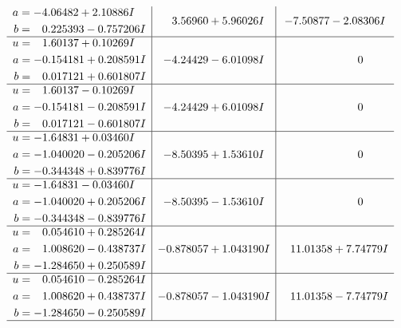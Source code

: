\documentclass[1p]{elsarticle_modified}
\theoremstyle{definition}
\begin{document}
$$\begin{array}{c|c|c}
\begin{aligned}
a &= -4.06482 + 2.10886 I \\
b &= \phantom{-}0.225393 - 0.757206 I\end{aligned}
 & \phantom{-}3.56960 + 5.96026 I & -7.50877 - 2.08306 I \\ \hline\begin{aligned}
u &= \phantom{-}1.60137 + 0.10269 I \\
a &= -0.154181 + 0.208591 I \\
b &= \phantom{-}0.017121 + 0.601807 I\end{aligned}
 & -4.24429 - 6.01098 I & \phantom{-0.000000 } 0 \\ \hline\begin{aligned}
u &= \phantom{-}1.60137 - 0.10269 I \\
a &= -0.154181 - 0.208591 I \\
b &= \phantom{-}0.017121 - 0.601807 I\end{aligned}
 & -4.24429 + 6.01098 I & \phantom{-0.000000 } 0 \\ \hline\begin{aligned}
u &= -1.64831 + 0.03460 I \\
a &= -1.040020 - 0.205206 I \\
b &= -0.344348 + 0.839776 I\end{aligned}
 & -8.50395 + 1.53610 I & \phantom{-0.000000 } 0 \\ \hline\begin{aligned}
u &= -1.64831 - 0.03460 I \\
a &= -1.040020 + 0.205206 I \\
b &= -0.344348 - 0.839776 I\end{aligned}
 & -8.50395 - 1.53610 I & \phantom{-0.000000 } 0 \\ \hline\begin{aligned}
u &= \phantom{-}0.054610 + 0.285264 I \\
a &= \phantom{-}1.008620 - 0.438737 I \\
b &= -1.284650 + 0.250589 I\end{aligned}
 & -0.878057 + 1.043190 I & \phantom{-}11.01358 + 7.74779 I \\ \hline\begin{aligned}
u &= \phantom{-}0.054610 - 0.285264 I \\
a &= \phantom{-}1.008620 + 0.438737 I \\
b &= -1.284650 - 0.250589 I\end{aligned}
 & -0.878057 - 1.043190 I & \phantom{-}11.01358 - 7.74779 I\\
 \hline 
 \end{array}$$\newpage
\end{document}
